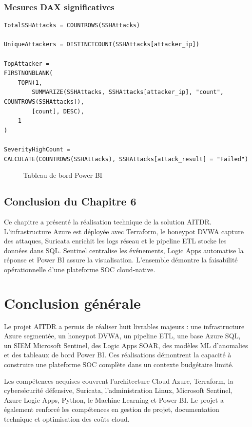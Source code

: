 \documentclass[11pt,a4paper]{report}
\newcommand{\placeholderfigure}[2]{%
\begin{figure}[H]
\centering
\fbox{\begin{minipage}{0.86\textwidth}
\centering
\vspace{0.8cm}
\textbf{[Insérer la Figure #1 ici]}
\vspace{0.8cm}
\end{minipage}}
\caption{#2}
\label{fig:#1}
\end{figure}
}
\begin{document}
\subsection{Mesures DAX significatives}
\begin{lstlisting}[style=sqlstyle, caption={Mesures DAX}]
TotalSSHAttacks = COUNTROWS(SSHAttacks)

UniqueAttackers = DISTINCTCOUNT(SSHAttacks[attacker_ip])

TopAttacker =
FIRSTNONBLANK(
    TOPN(1,
        SUMMARIZE(SSHAttacks, SSHAttacks[attacker_ip], "count", COUNTROWS(SSHAttacks)),
        [count], DESC),
    1
)

SeverityHighCount =
CALCULATE(COUNTROWS(SSHAttacks), SSHAttacks[attack_result] = "Failed")
\end{lstlisting}
\placeholderfigure{6.10}{Tableau de bord Power BI}

\section{Conclusion du Chapitre 6}
Ce chapitre a présenté la réalisation technique de la solution AITDR. L'infrastructure Azure est déployée avec Terraform, le honeypot DVWA capture des attaques, Suricata enrichit les logs réseau et le pipeline ETL stocke les données dans SQL. Sentinel centralise les événements, Logic Apps automatise la réponse et Power BI assure la visualisation. L'ensemble démontre la faisabilité opérationnelle d'une plateforme SOC cloud-native.

\chapter*{Conclusion générale}

Le projet AITDR a permis de réaliser huit livrables majeurs : une infrastructure Azure segmentée, un honeypot DVWA, un pipeline ETL, une base Azure SQL, un SIEM Microsoft Sentinel, des Logic Apps SOAR, des modèles ML d'anomalies et des tableaux de bord Power BI. Ces réalisations démontrent la capacité à construire une plateforme SOC complète dans un contexte budgétaire limité.

Les compétences acquises couvrent l'architecture Cloud Azure, Terraform, la cybersécurité défensive, Suricata, l'administration Linux, Microsoft Sentinel, Azure Logic Apps, Python, le Machine Learning et Power BI. Le projet a également renforcé les compétences en gestion de projet, documentation technique et optimisation des coûts cloud.
\end{document}
